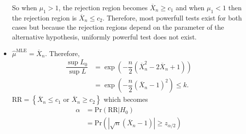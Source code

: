 \documentclass[answers]{exam}
\begin{document}
\begin{questions}
\begin{solution}
\begin{itemize}
\begin{equation}
            \end{equation}
            So when $\mu_{1}>1$, the rejection region becomes $\overline{X}_{n}\geq c_{1}$ and when $\mu_{1}<1$ then the rejection region is $\overline{X}_{n}\leq c_{2}$. Therefore, most powerfull tests exist for both cases but because the rejection regions depend on the parameter of the alternative hypothesis, uniformly powerful test does not exist.
            \item $\hat{\mu}^{\text{MLE}}=\overline{X}_{n}$. Therefore,
            \begin{align}
              \dfrac{\sup L_{0}}{\sup L}&= \exp\left(-\dfrac{n}{2}\left(\overline{X}_{n}^{2}-2\overline{X}_{n}+1\right)\right)\\
              &= \exp\left(-\dfrac{n}{2}\left(\overline{X}_{n}-1\right)^{2}\right) \leq k.
            \end{align}
            $\mathrm{RR} = \left\{\overline{X}_{n}\leq c_{1}\text{ or } \overline{X}_{n}\geq c_{2} \right\}$ which becomes 
            \begin{align}
              \alpha &= \mathrm{Pr}\left(\mathrm{RR}|H_{0}\right)\\
              &= \mathrm{Pr}\left(\left|\sqrt{n}\left(\overline{X}_{n}-1\right)\right|\geq z_{\alpha/2}\right)
            \end{align}
            
         \end{itemize}
      \end{solution}
\end{questions}
\end{document}
